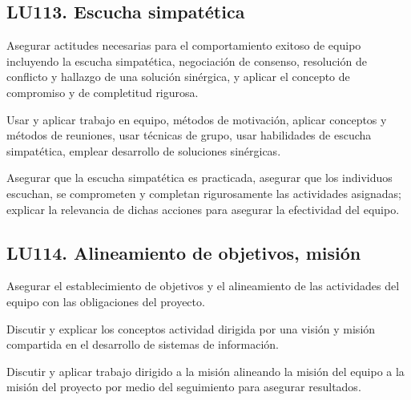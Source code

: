 \subsection{LU113. Escucha simpatética}\label{sec:LU113}
\begin{LearningUnit}
\begin{LUGoal}
\item Asegurar actitudes necesarias para el comportamiento exitoso de equipo incluyendo la escucha simpatética, negociación de consenso, resolución de conflicto y hallazgo de una solución sinérgica, y aplicar el concepto de compromiso y de completitud rigurosa.
\end{LUGoal}

\begin{LUObjective}
\item Usar y aplicar trabajo en equipo, métodos de motivación, aplicar conceptos y métodos de reuniones, usar técnicas de grupo, usar habilidades de escucha simpatética, emplear desarrollo de soluciones sinérgicas.
\item Asegurar que la escucha simpatética es practicada, asegurar que los individuos escuchan, se comprometen y completan rigurosamente las actividades asignadas; explicar la relevancia de dichas acciones para asegurar la efectividad del equipo.
\end{LUObjective}
\end{LearningUnit}

\subsection{LU114. Alineamiento de objetivos, misión}\label{sec:LU114}
\begin{LearningUnit}
\begin{LUGoal}
\item Asegurar el establecimiento de objetivos y el alineamiento de las actividades del equipo con las obligaciones del proyecto.
\end{LUGoal}

\begin{LUObjective}
\item Discutir y explicar los conceptos actividad dirigida por una visión y misión compartida en el desarrollo de sistemas de información.
\item Discutir y aplicar trabajo dirigido a la misión alineando la misión del equipo a la misión del proyecto por medio del seguimiento para asegurar resultados.
\end{LUObjective}
\end{LearningUnit}

